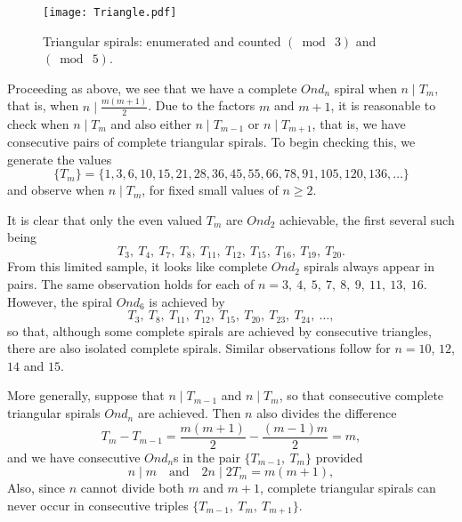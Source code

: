 \documentclass{article}
\theoremstyle{definition}
\def\pmod#1{(\bmod\  #1)}
\def\com#1{\quad\text{{#1}}\quad}
\begin{document}
\begin{figure}[htb]
  \centering
  \texttt{[image: Triangle.pdf]}
  \caption{Triangular spirals: enumerated and counted $\pmod 3$ and
    $\pmod 5$.}
  \label{fig:triangles}
\end{figure}

Proceeding as above, we see that we have a complete $Ond_n$ spiral
when $n\mid T_m$, that is, when $n\mid \frac{m(m+1)}2$.  Due to the factors
$m$ and $m+1$, it is reasonable to check when $n\mid T_m$ and also either
$n\mid T_{m-1}$ or $n\mid T_{m+1}$, that is, we have consecutive pairs of
complete triangular spirals.  To begin checking this, we generate the
values
\[
  \{ T_m \} =
  \{ 1, 3, 6, 10, 15, 21, 28, 36, 45, 55, 66, 78,
     91, 105, 120, 136, \dots \}
\]
and observe when $n\mid T_m$, for fixed small values of $n \ge 2$.

It is clear that only the even valued $T_m$ are $Ond_2$ achievable,
the first several such being
\[
T_3,\ T_4,\ T_7,\ T_8,\ T_{11},\ T_{12},\ T_{15},\ T_{16},\  T_{19},\ T_{20}.
\]
From this limited sample, it looks like complete $Ond_2$ spirals always
appear in pairs.  The same observation holds for each of
$n = 3,\ 4,\ 5,\ 7,\ 8,\ 9,\ 11,\ 13,\ 16$.
However, the spiral $Ond_6$ is achieved by
\[
T_3,\ T_8,\ T_{11},\ T_{12},\ T_{15},\ T_{20},\ T_{23},\ T_{24},\ \ldots,
\]
so that, although some complete spirals are achieved by consecutive
triangles, there are also isolated complete spirals.  Similar
observations follow for $n=10$, $12$, $14$ and $15$.

More generally, suppose that $n\mid T_{m-1}$ and $n\mid T_m$, so that
consecutive complete triangular spirals $Ond_n$ are achieved.  Then
$n$ also divides the difference
\[
  T_m - T_{m-1} = \frac{m(m+1)}2 - \frac{(m-1)m}2
     = m,
\]
and we have consecutive $Ond_n$s in the pair $\{T_{m-1},\ T_m\}$
provided
\[
  n\mid m \com{and} 2n\mid 2T_m=m(m+1),
\]
Also, since $n$ cannot divide both $m$ and $m+1$,
complete triangular spirals can never occur in consecutive triples
$\{T_{m-1},\ T_m,\ T_{m+1}\}$.
\end{document}
